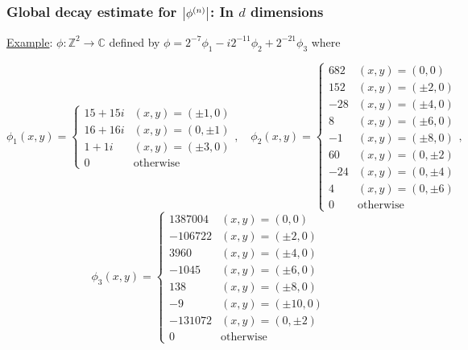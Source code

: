 \documentclass{beamer}
\theoremstyle{definition}
\begin{document}


\begin{frame}
\frametitle{Global decay estimate for $\abs{\phi^{(n)}}$: In $d$ dimensions}

\underline{Example}:  $\phi: \mathbb{Z}^2 \to \mathbb{C}$ defined by $\phi=2^{-7}\phi_1-i2^{-11}\phi_2+2^{-21}\phi_3$ where

\scriptsize
\begin{equation*}
\phi_1(x,y)=\begin{cases}
15 + 15i &(x,y) = (\pm 1,0)\\
16 + 16i &(x,y) = (0, \pm 1)\\
1 + 1i &(x,y) = (\pm 3,0)\\
0 &\mbox{otherwise}
\end{cases},
\quad
\phi_2(x,y) = 
\begin{cases}
682 &(x,y) = (0,0)\\
152  &(x,y) = (\pm 2,0)\\
-28  &(x,y) = (\pm 4,0)\\
8 &(x,y) = (\pm 6, 0)\\
-1 &(x,y) = (\pm 8, 0)\\
60  &(x,y) = (0, \pm 2)\\
-24 &(x,y) = (0,\pm 4)\\
4 &(x,y) = (0,\pm 6)\\
0 &\mbox{otherwise}
\end{cases},
\end{equation*}
\begin{equation*}
\phi_3(x,y) = 
\begin{cases}
1387004 &(x,y) = (0,0)\\
-106722 &(x,y) = (\pm 2,0)\\
3960 &(x,y) = (\pm 4,0)\\
-1045 &(x,y) = (\pm 6, 0)\\
138  &(x,y) = (\pm 8, 0)\\
-9 &(x,y) = (\pm 10, 0)\\
-131072 &(x,y) = (0, \pm 2)\\
0 &\mbox{otherwise}
\end{cases}
\end{equation*}



\end{frame}
\end{document}
